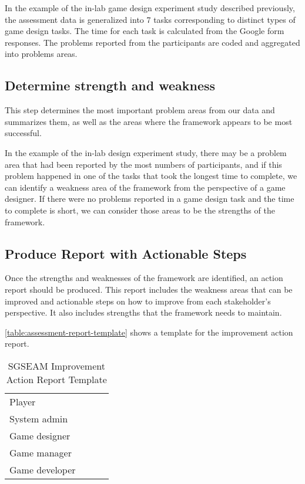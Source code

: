 In the example of the in-lab game design experiment study described previously, the assessment data is generalized into 7 tasks
corresponding to distinct types of game design tasks. The time for each task is calculated from the Google form responses. The 
problems reported from the participants are coded and aggregated into problems areas. 

\subsection{Determine strength and weakness}

This step determines the most important problem areas from our
data and summarizes them, as well as the areas where the framework
appears to be most successful.

In the example of the in-lab design experiment study, there may be a problem area that had been reported by the most numbers
of participants, and if this problem happened in one of the tasks that took the longest time to complete, we can identify a weakness 
area of the framework from the perspective of a game designer. If there were no problems reported in a game design task and 
the time to complete is short, we can consider those areas to be the strengths of the framework.

\subsection{Produce Report with Actionable Steps}

Once the strengths and weaknesses of the framework are identified, an action report should be produced.  This report
includes the weakness areas that can be improved and actionable steps
on how to improve from each stakeholder's perspective. It also
includes strengths that the framework needs to maintain. 

\autoref{table:assessment-report-template} shows a template for the improvement action report.
\begin{table}[ht!]
  \centering
  \begin{tabular}{|p{}|P{0.2\columnwidth}|P{0.2\columnwidth}|P{0.3\columnwidth}|}
    \hline
     &
     &
     & 
     \\
    \hline
    Player & & & \\
    \hline
    System admin & & & \\
    \hline
    Game designer & & & \\
    \hline
    Game manager & & &\\
    \hline
    Game developer & & &\\
    \hline
  \end{tabular}
  \caption{SGSEAM Improvement Action Report Template}
  \label{table:assessment-report-template}
\end{table}

